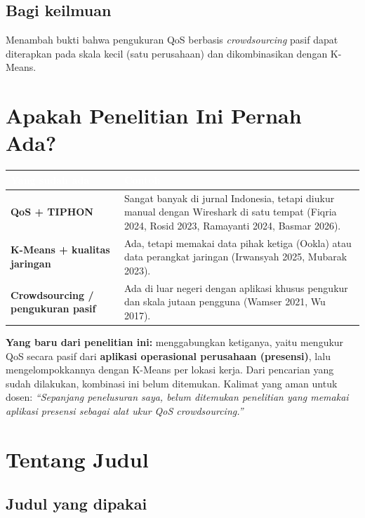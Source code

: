\documentclass[11pt,a4paper]{article}
\newcommand{\term}[1]{\cellcolor{band}\textbf{#1}}
\newcommand{\kepala}[2]{\rowcolor{head}\textcolor{white}{\textbf{#1}} & \textcolor{white}{\textbf{#2}}\\ \midrule}
\begin{document}
\subsection{Bagi keilmuan}
Menambah bukti bahwa pengukuran QoS berbasis \textit{crowdsourcing} pasif dapat diterapkan pada skala kecil (satu perusahaan) dan dikombinasikan dengan K-Means.

\section{Apakah Penelitian Ini Pernah Ada?}
\begin{longtable}{KV}
\toprule
\kepala{Yang sudah ada}{Contoh}
\endhead
\term{QoS + TIPHON} & Sangat banyak di jurnal Indonesia, tetapi diukur manual dengan Wireshark di satu tempat (Fiqria 2024, Rosid 2023, Ramayanti 2024, Basmar 2026). \\
\term{K-Means + kualitas jaringan} & Ada, tetapi memakai data pihak ketiga (Ookla) atau data perangkat jaringan (Irwansyah 2025, Mubarak 2023). \\
\term{Crowdsourcing / pengukuran pasif} & Ada di luar negeri dengan aplikasi khusus pengukur dan skala jutaan pengguna (Wamser 2021, Wu 2017). \\
\bottomrule
\end{longtable}
\textbf{Yang baru dari penelitian ini:} menggabungkan ketiganya, yaitu mengukur QoS secara pasif dari \textbf{aplikasi operasional perusahaan (presensi)}, lalu mengelompokkannya dengan K-Means per lokasi kerja. Dari pencarian yang sudah dilakukan, kombinasi ini belum ditemukan. Kalimat yang aman untuk dosen: \textit{``Sepanjang penelusuran saya, belum ditemukan penelitian yang memakai aplikasi presensi sebagai alat ukur QoS crowdsourcing.''}

\section{Tentang Judul}
\subsection{Judul yang dipakai}
\end{document}
